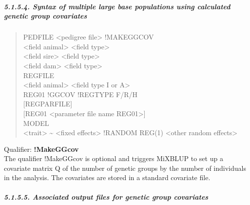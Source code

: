\subparagraph{5.1.5.4. Syntax of multiple large base populations using
calculated genetic group covariates}\label{Gene99}

\begin{quote}
PEDFILE \textless pedigree file\textgreater{} !MAKEGGCOV\\
\textless field animal\textgreater{} \textless field
type\textgreater{}\\
\textless field sire\textgreater{} \textless field type\textgreater{}\\
\textless field dam\textgreater{} \textless field type\textgreater{}\\
REGFILE\\
\textless field animal\textgreater{} \textless field type I or
A\textgreater{}\\
REG01 !GGCOV !REGTYPE F/R/H\\
{[}REGPARFILE{]}\\
{[}REG01 \textless parameter file name REG01\textgreater{]}\\
MODEL\\
\textless trait\textgreater{} \textasciitilde{} \textless fixed
effects\textgreater{} !RANDOM REG(1) \textless other random
effects\textgreater{}
\end{quote}

Qualifier: \textbf{!MakeGGcov}\\
The qualifier !MakeGGcov is optional and triggers MiXBLUP to set up a
covariate matrix Q of the number of genetic groups by the number of
individuals in the analysis. The covariates are stored in a standard
covariate file.

\subparagraph{5.1.5.5. Associated output files for genetic group
covariates}\label{Gene17}

